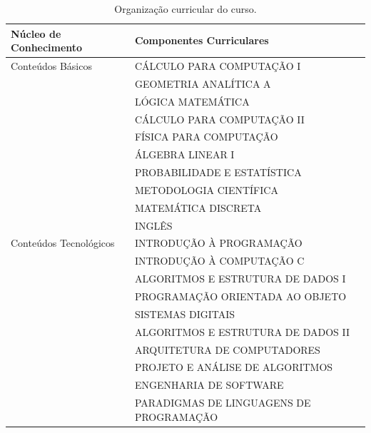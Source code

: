 \documentclass[
	12pt,				%
	openright,			%
  oneside,     %
	a4paper,			%
 hyphens,
	chapter=TITLE,		%
	english,			%
	french,				%
	spanish,			%
	brazil				%
	]{abntex2}
\begin{document}
\begin{center}
    \begin{scriptsize}
      \begin{longtable}{@{}lp{10cm}}
        \caption{\label{quadro:organizacao-curricular-do-curso}Organização curricular do curso.}\\
      \toprule
      \textbf{Núcleo de Conhecimento} & \textbf{Componentes Curriculares} \\ 
      \midrule
        Conteúdos Básicos 
                                & CÁLCULO PARA COMPUTAÇÃO I \\
                                & GEOMETRIA ANALÍTICA A\\
                                & LÓGICA MATEMÁTICA \\
                                & CÁLCULO PARA COMPUTAÇÃO II \\
                                & FÍSICA PARA COMPUTAÇÃO \\ 
                                & ÁLGEBRA LINEAR I \\
                                & PROBABILIDADE E ESTATÍSTICA \\
                                & METODOLOGIA CIENTÍFICA \\
                                & MATEMÁTICA DISCRETA \\
                                & INGLÊS  \\
                                \midrule
        Conteúdos Tecnológicos
                                & INTRODUÇÃO À PROGRAMAÇÃO \\
                                & INTRODUÇÃO À COMPUTAÇÃO C \\
                                & ALGORITMOS E ESTRUTURA DE DADOS I\\
                                & PROGRAMAÇÃO ORIENTADA AO OBJETO \\
                                & SISTEMAS DIGITAIS \\
                                & ALGORITMOS E ESTRUTURA DE DADOS II \\
                                & ARQUITETURA DE COMPUTADORES \\
                                & PROJETO E ANÁLISE DE ALGORITMOS \\
                                & ENGENHARIA DE SOFTWARE \\
                                & PARADIGMAS DE LINGUAGENS DE PROGRAMAÇÃO \\

\end{longtable}
\end{scriptsize}
\end{center}
\end{document}

